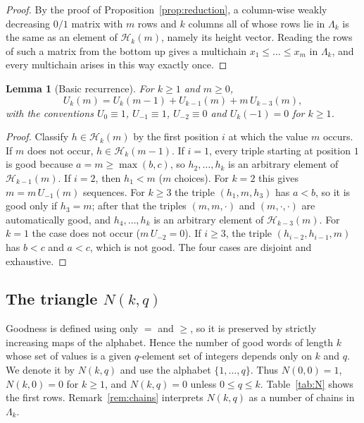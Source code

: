 \documentclass[11pt]{amsart}
\newtheorem{lemma}[theorem]{Lemma}
\theoremstyle{definition}
\begin{document}
\begin{proof}
By the proof of Proposition~\ref{prop:reduction}, a column-wise weakly decreasing $0/1$ matrix with $m$ rows and $k$ columns all of whose rows lie in $\Lambda_k$ is the same as an element of $\mathcal H_k(m)$, namely its height vector. Reading the rows of such a matrix from the bottom up gives a multichain $x_1\le\dots\le x_m$ in $\Lambda_k$, and every multichain arises in this way exactly once.
\end{proof}

\begin{lemma}[Basic recurrence]\label{lem:rec}
For $k\ge1$ and $m\ge0$,
\[
  U_k(m)=U_k(m-1)+U_{k-1}(m)+m\,U_{k-3}(m),
\]
with the conventions $U_0\equiv1$, $U_{-1}\equiv1$, $U_{-2}\equiv0$ and $U_k(-1)=0$ for $k\ge1$.
\end{lemma}

\begin{proof}
Classify $h\in \mathcal H_k(m)$ by the first position $i$ at which the value $m$ occurs.
If $m$ does not occur, $h\in \mathcal H_k(m-1)$.
If $i=1$, every triple starting at position $1$ is good because $a=m\ge\max(b,c)$, so $h_2,\dots,h_k$ is an arbitrary element of $\mathcal H_{k-1}(m)$.
If $i=2$, then $h_1<m$ ($m$ choices). For $k=2$ this gives $m=m\,U_{-1}(m)$ sequences. For $k\ge3$ the triple $(h_1,m,h_3)$ has $a<b$, so it is good only if $h_3=m$; after that the triples $(m,m,\cdot)$ and $(m,\cdot,\cdot)$ are automatically good, and $h_4,\dots,h_k$ is an arbitrary element of $\mathcal H_{k-3}(m)$. For $k=1$ the case does not occur ($m\,U_{-2}=0$).
If $i\ge3$, the triple $(h_{i-2},h_{i-1},m)$ has $b<c$ and $a<c$, which is not good.
The four cases are disjoint and exhaustive.
\end{proof}

\subsection{The triangle \texorpdfstring{$N(k,q)$}{N(k,q)}}
Goodness is defined using only $=$ and $\ge$, so it is preserved by strictly increasing maps of the alphabet. Hence the number of good words of length $k$ whose set of values is a given $q$-element set of integers depends only on $k$ and $q$. We denote it by $N(k,q)$ and use the alphabet $\{1,\dots,q\}$. Thus $N(0,0)=1$, $N(k,0)=0$ for $k\ge1$, and $N(k,q)=0$ unless $0\le q\le k$. Table~\ref{tab:N} shows the first rows. Remark~\ref{rem:chains} interprets $N(k,q)$ as a number of chains in $\Lambda_k$.
\end{document}
